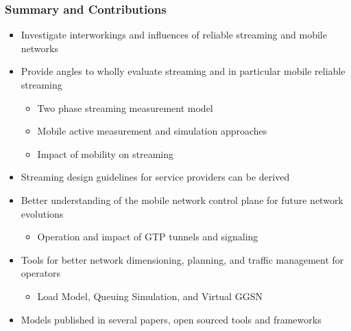 \documentclass{beamer}
\begin{document}




\begin{frame}
	\frametitle{Summary and Contributions}

	\begin{itemize}
		\item Investigate interworkings and influences of reliable streaming and mobile networks
		\item Provide angles to wholly evaluate streaming and in particular mobile reliable streaming
		\begin{itemize}
			\item Two phase streaming measurement model
			\item Mobile active measurement and simulation approaches
			\item Impact of mobility on streaming
		\end{itemize}
		\item Streaming design guidelines for service providers can be derived
		\vspace{1em}
		\item Better understanding of the mobile network control plane for future network evolutions
			\begin{itemize}
				\item Operation and impact of GTP tunnels and signaling
			\end{itemize}
		\item Tools for better network dimensioning, planning, and traffic management for operators
			\begin{itemize}
				\item Load Model, Queuing Simulation, and Virtual GGSN
			\end{itemize}
		\item Models published in several papers, open sourced tools and frameworks
	\end{itemize}
\end{frame}
\end{document}
